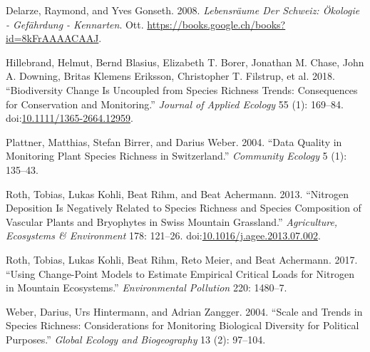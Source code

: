 \documentclass[fleqn,10pt,lineno]{wlpeerj} %
\theoremstyle{definition}
\theoremstyle{definition}
\theoremstyle{definition}
\theoremstyle{remark}
\begin{document}
\hypertarget{ref-Delarze2008}{}
Delarze, Raymond, and Yves Gonseth. 2008. \emph{Lebensräume Der Schweiz:
Ökologie - Gefährdung - Kennarten}. Ott.
\url{https://books.google.ch/books?id=8kFrAAAACAAJ}.

\hypertarget{ref-Hillebrand2018}{}
Hillebrand, Helmut, Bernd Blasius, Elizabeth T. Borer, Jonathan M.
Chase, John A. Downing, Britas Klemens Eriksson, Christopher T.
Filstrup, et al. 2018. ``Biodiversity Change Is Uncoupled from Species
Richness Trends: Consequences for Conservation and Monitoring.''
\emph{Journal of Applied Ecology} 55 (1): 169--84.
doi:\href{https://doi.org/10.1111/1365-2664.12959}{10.1111/1365-2664.12959}.

\hypertarget{ref-Plattner2004}{}
Plattner, Matthias, Stefan Birrer, and Darius Weber. 2004. ``Data
Quality in Monitoring Plant Species Richness in Switzerland.''
\emph{Community Ecology} 5 (1): 135--43.

\hypertarget{ref-Roth2013}{}
Roth, Tobias, Lukas Kohli, Beat Rihm, and Beat Achermann. 2013.
``Nitrogen Deposition Is Negatively Related to Species Richness and
Species Composition of Vascular Plants and Bryophytes in Swiss Mountain
Grassland.'' \emph{Agriculture, Ecosystems \& Environment} 178: 121--26.
doi:\href{https://doi.org/10.1016/j.agee.2013.07.002}{10.1016/j.agee.2013.07.002}.

\hypertarget{ref-Roth2017}{}
Roth, Tobias, Lukas Kohli, Beat Rihm, Reto Meier, and Beat Achermann.
2017. ``Using Change-Point Models to Estimate Empirical Critical Loads
for Nitrogen in Mountain Ecosystems.'' \emph{Environmental Pollution}
220: 1480--7.

\hypertarget{ref-Weber2004}{}
Weber, Darius, Urs Hintermann, and Adrian Zangger. 2004. ``Scale and
Trends in Species Richness: Considerations for Monitoring Biological
Diversity for Political Purposes.'' \emph{Global Ecology and
Biogeography} 13 (2): 97--104.
\end{document}
